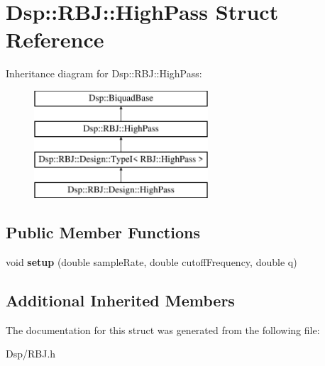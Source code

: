 \hypertarget{structDsp_1_1RBJ_1_1HighPass}{\section{Dsp\-:\-:R\-B\-J\-:\-:High\-Pass Struct Reference}
\label{structDsp_1_1RBJ_1_1HighPass}
}
Inheritance diagram for Dsp\-:\-:R\-B\-J\-:\-:High\-Pass\-:\begin{figure}[H]
\begin{center}
\leavevmode
\includegraphics[height=4.000000cm]{structDsp_1_1RBJ_1_1HighPass}
\end{center}
\end{figure}
\subsection*{Public Member Functions}
\begin{DoxyCompactItemize}
\item 
\hypertarget{structDsp_1_1RBJ_1_1HighPass_aaca48c18c22f53904ef3ff19f191cffd}{void {\bfseries setup} (double sample\-Rate, double cutoff\-Frequency, double q)}\label{structDsp_1_1RBJ_1_1HighPass_aaca48c18c22f53904ef3ff19f191cffd}

\end{DoxyCompactItemize}
\subsection*{Additional Inherited Members}


The documentation for this struct was generated from the following file\-:\begin{DoxyCompactItemize}
\item 
Dsp/R\-B\-J.\-h\end{DoxyCompactItemize}
